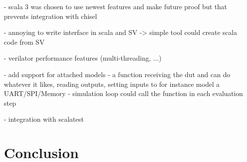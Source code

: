 \documentclass[12pt]{report}
\begin{document}
- scala 3 was chosen to use newest features and make future proof but that prevents integration with chisel

- annoying to write interface in scala and SV -> simple tool could create scala code from SV


- verilator performance features (multi-threading, ...)

- add support for attached models
- a function receiving the dut and can do whatever it likes, reading outputs, setting inputs to for instance model a
UART/SPI/Memory
- simulation loop could call the function in each evaluation step

- integration with scalatest

\chapter{Conclusion} %

\printbibliography
\end{document}
